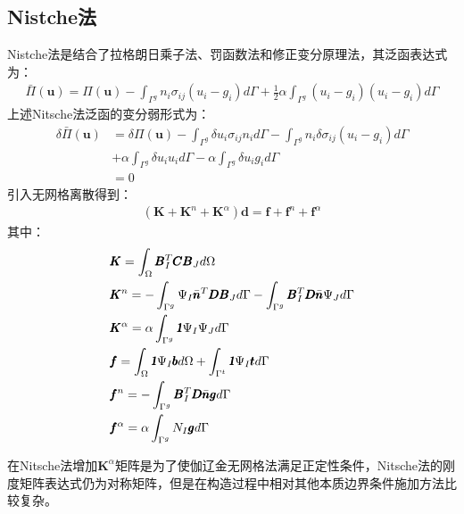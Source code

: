 \subsection{Nistche法}
Nistche法是结合了拉格朗日乘子法、罚函数法和修正变分原理法，其泛函表达式为：
\begin{equation}
\begin{split}
    \bar{\Pi}(\pmb{u})=\Pi(\pmb{u})-\int_{\Gamma^g}n_i\sigma_{ij}(u_i-g_i)d\Gamma+\frac{1}{2}\alpha\int_{\Gamma^g}(u_i-g_i)(u_i-g_i)d\Gamma
\end{split}
\end{equation}
上述Nitsche法泛函的变分弱形式为：
\begin{equation}
\begin{split}
    \delta\bar{\Pi}(\pmb{u})&=\delta\Pi(\pmb{u})-\int_{\Gamma^g}\delta u_i\sigma_{ij}n_id\Gamma-\int_{\Gamma^g}n_i\delta\sigma_{ij}(u_i-g_i)d\Gamma\\
&+\alpha\int_{\Gamma^g}\delta u_iu_id\Gamma-\alpha\int_{\Gamma^g}\delta u_i g_id\Gamma\\
&=0
\end{split}
\end{equation}
引入无网格离散得到：
\begin{equation}
\begin{split}
    (\pmb{K}+\pmb{K}^n+\pmb{K}^{\alpha})\pmb{d}=\pmb{f}+\pmb{f}^n+\pmb{f}^{\alpha}
\end{split}
\end{equation}
其中：
\begin{equation}
\begin{split}
    &\pmb{K}=\int_{\Omega}\pmb{B}_I^T\pmb{C}\pmb{B}_Jd\Omega\\
    &\pmb{K}^n=-\int_{\Gamma^g}\Psi_I\bar{\pmb{n}}^T\pmb{D}\pmb{B}_Jd\Gamma-\int_{\Gamma^g}\pmb{B}_I^T\pmb{D}\bar{\pmb{n}}\Psi_Jd\Gamma\\
    &\pmb{K}^{\alpha}=\alpha\int_{\Gamma^g}\pmb{\textsl{1}}\Psi_I\Psi_Jd\Gamma\\
    &\pmb{f}=\int_{\Omega}\pmb{\textsl{1}}\Psi_I\pmb{b}d\Omega+\int_{\Gamma^t}\pmb{\textsl{1}}\Psi_I\pmb{t}d\Gamma\\
    &\pmb{f}^n=-\int_{\Gamma^g}\pmb{B}_I^T\pmb{D}\bar{\pmb{n}}\pmb{g}d\Gamma\\
    &\pmb{f}^{\alpha}=\alpha\int_{\Gamma^g}N_I\pmb{g}d\Gamma
\end{split}
\end{equation}\par
在Nitsche法增加$\pmb{K}^{\alpha}$矩阵是为了使伽辽金无网格法满足正定性条件，Nitsche法的刚度矩阵表达式仍为对称矩阵，但是在构造过程中相对其他本质边界条件施加方法比较复杂。
